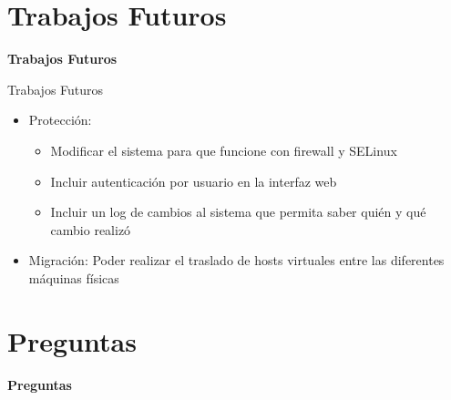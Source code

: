 \section{Trabajos Futuros}
\begin{frame}
    \Huge
    \centering
    \textbf{Trabajos Futuros}

\end{frame}

\begin{frame}{Trabajos Futuros}
    \vspace{0cm}
    \begin{itemize}
        \item Protección: 
        \begin{itemize}
            \item  Modificar el sistema para que funcione con firewall y SELinux
            \item  Incluir autenticación por usuario en la interfaz web
            \item  Incluir un log de cambios al sistema que permita saber quién y qué cambio realizó
        \end{itemize}
        \item Migración: Poder realizar el traslado de hosts virtuales entre las diferentes máquinas físicas
        
    \end{itemize}

\end{frame}

\section{Preguntas}
\begin{frame}
    \Huge
    \centering
    \textbf{Preguntas}

\end{frame}
